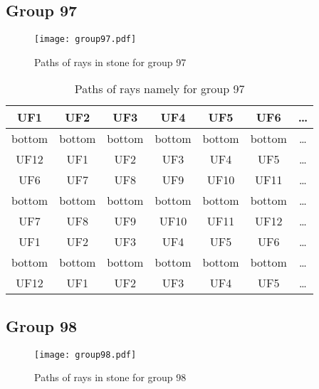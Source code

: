 \subsection*{Group 97}






\begin{figure}[h!]
\centering
\texttt{[image: group97.pdf]}
\caption{Paths of rays in stone for group 97}
\label{table:FigGroup97}
\end{figure}



\begin{table}[h!]
\centering
\begin{tabular}{|c|c|c|c|c|c|c|}
\hline
UF1 & UF2 & UF3 & UF4 & UF5 & UF6 & \dots \\
\hline
bottom & bottom & bottom & bottom & bottom & bottom & \dots \\
\hline
UF12 & UF1 & UF2 & UF3 & UF4 & UF5 & \dots \\
\hline
UF6 & UF7 & UF8 & UF9 & UF10 & UF11 & \dots \\
\hline
bottom & bottom & bottom & bottom & bottom & bottom & \dots \\
\hline
UF7 & UF8 & UF9 & UF10 & UF11 & UF12 & \dots \\
\hline
UF1 & UF2 & UF3 & UF4 & UF5 & UF6 & \dots \\
\hline
bottom & bottom & bottom & bottom & bottom & bottom & \dots \\
\hline
UF12 & UF1 & UF2 & UF3 & UF4 & UF5 & \dots \\
\hline
\end{tabular}
\caption{Paths of rays namely for group 97}
\label{table:TableGroup97}
\end{table}
\newpage
\subsection*{Group 98}






\begin{figure}[h!]
\centering
\texttt{[image: group98.pdf]}
\caption{Paths of rays in stone for group 98}
\label{table:FigGroup98}
\end{figure}



